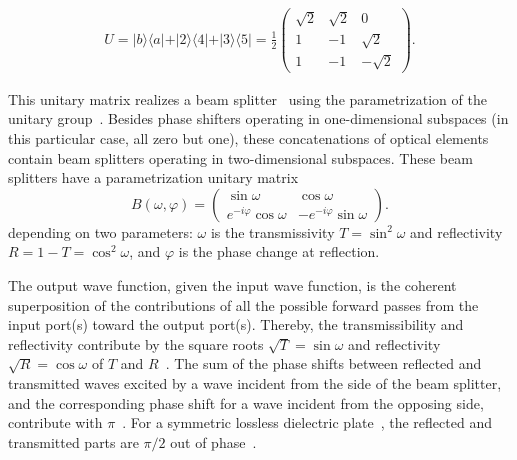 \documentclass[%
 superscriptaddress,
  preprint,
 showpacs,
 showkeys,
 nofootinbib,
  amsmath,amssymb,
  aps,
 pra,
  longbibliography,
  floatfix,
 ]{revtex4-2}
\theoremstyle{definition}
\begin{document}
\begin{equation*}
\begin{split}
U =
\vert b \rangle \langle a \vert
+
\vert 2 \rangle \langle 4 \vert
+
\vert 3 \rangle \langle 5 \vert
=  \frac12
\begin{pmatrix}
\sqrt{2} &  \sqrt{2}& 0\\
1& -1&  \sqrt{2} \\
1& -1& - \sqrt{2}
\end{pmatrix}
.
\end{split}
\end{equation*}

This unitary matrix realizes  a beam splitter~\cite{reck-94,rzbb,%
de_Guise_2018}
using the parametrization of the unitary group~\cite{murnaghan}.
Besides phase shifters operating in one-dimensional subspaces (in this particular case, all zero but one),
these concatenations of optical elements
contain beam splitters operating in two-dimensional subspaces.
These beam splitters have a parametrization unitary matrix
\begin{equation*}
B( \omega , \varphi )  =
\begin{pmatrix}
 \sin  \omega  & \cos  \omega
\\
e^{-i \varphi } \cos  \omega  &-e^{-i \varphi } \sin  \omega
\end{pmatrix}.
\end{equation*}
depending on two parameters:
 $\omega$ is the transmissivity $T=\sin^2\omega$ and reflectivity $R=1-T=\cos^2\omega$,
and $\varphi$ is the phase change at reflection.






The output wave function, given the input wave function,
is the coherent superposition of the contributions of all the possible forward passes from the input port(s) toward the output port(s).
Thereby, the transmissibility and reflectivity contribute by the square roots $\sqrt{T}=\sin \omega$
and reflectivity $\sqrt{R}=\cos \omega$ of $T$ and $R$~\cite{green-horn-zei}.
The sum of the phase shifts between reflected and transmitted waves
excited by a wave incident from the side of the beam splitter, and the corresponding phase shift
for a wave incident from the opposing side, contribute with $\pi$~\cite{zeilinger:882}.
For a symmetric lossless dielectric plate~\cite{Lai_1985},
the reflected and transmitted parts are $\pi/2$ out of phase~\cite{Degiorgio_1980,green-horn-zei}.
\end{document}
